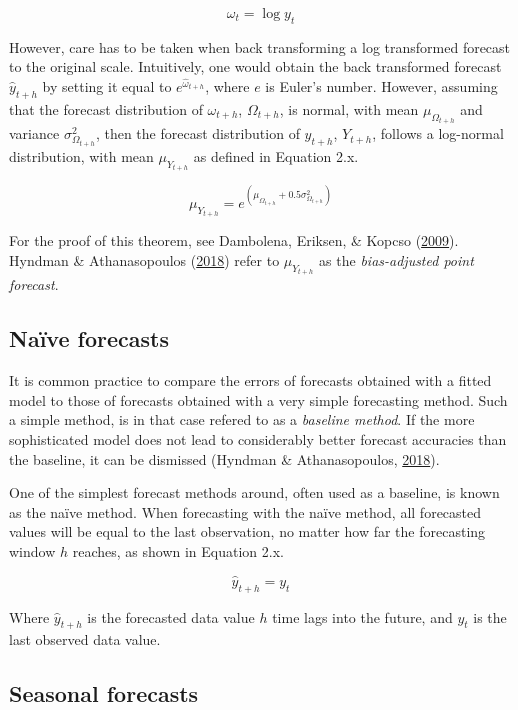 \documentclass[12pt,oneside]{reedthesis}
\begin{document}
\[ \omega_{t} = \log y_{t} \]

However, care has to be taken when back transforming a log transformed
forecast to the original scale. Intuitively, one would obtain the back
transformed forecast \(\hat{y}_{t+h}\) by setting it equal to
\(e^{\hat{\omega}_{t+h}}\), where \(e\) is Euler's number. However,
assuming that the forecast distribution of \(\omega_{t+h}\),
\(\Omega_{t+h}\), is normal, with mean \(\mu_{\Omega_{t+h}}\) and
variance \(\sigma_{\Omega_{t+h}}^{2}\), then the forecast distribution
of \(y_{t+h}\), \(Y_{t+h}\), follows a log-normal distribution, with
mean \(\mu_{Y_{t+h}}\) as defined in Equation 2.x.

\[ \mu_{Y_{t+h}} = e^{(\mu_{\Omega_{t+h}} + 0.5 \sigma_{\Omega_{t+h}}^{2})} \]

For the proof of this theorem, see Dambolena, Eriksen, \& Kopcso
(\protect\hyperlink{ref-dambolena2009}{2009}). Hyndman \& Athanasopoulos
(\protect\hyperlink{ref-hyndman2018fpp}{2018}) refer to
\(\mu_{Y_{t+h}}\) as the \emph{bias-adjusted point forecast}.

\subsection{Naïve forecasts}\label{naive-forecasts}

It is common practice to compare the errors of forecasts obtained with a
fitted model to those of forecasts obtained with a very simple
forecasting method. Such a simple method, is in that case refered to as
a \emph{baseline method}. If the more sophisticated model does not lead
to considerably better forecast accuracies than the baseline, it can be
dismissed (Hyndman \& Athanasopoulos,
\protect\hyperlink{ref-hyndman2018fpp}{2018}).

One of the simplest forecast methods around, often used as a baseline,
is known as the naïve method. When forecasting with the naïve method,
all forecasted values will be equal to the last observation, no matter
how far the forecasting window \(h\) reaches, as shown in Equation 2.x.

\[ \hat{y}_{t+h} = y_{t} \]

Where \(\hat{y}_{t+h}\) is the forecasted data value \(h\) time lags
into the future, and \(y_{t}\) is the last observed data value.

\subsection{Seasonal forecasts}\label{seasonal-forecasts}
\end{document}
